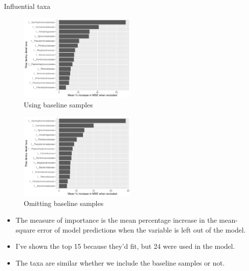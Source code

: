 \documentclass{beamer}
\begin{document}
\begin{frame}{Influential taxa}

  \begin{minipage}{0.47\textwidth}
    \begin{figure}
    \includegraphics[width=2.25in]{HenleyLake/bacteria/use_families/w_ribs/w_baseline/families_rib_PercIncMSE_barchart}
    \caption{{\tiny Using baseline samples}}
\end{figure}
\end{minipage}
\begin{minipage}{0.47\textwidth}
  \begin{figure}
    \includegraphics[width=2.25in]{HenleyLake/bacteria/use_families/w_ribs/no_baseline/families_rib_no_baseline_PercIncMSE_barchart}
    \caption{{\tiny Omitting baseline samples}}
  \end{figure}
  \end{minipage}
  \vspace{0.1in}
  {\scriptsize
  \begin{itemize}
  \item The measure of importance is the mean percentage increase in the
    mean-square error of model predictions when the variable is left out of the
    model. 
  \item I've shown the top 15 because they'd fit, but 24 were used in the model.
  \item The taxa are similar whether we include the baseline samples or not.
  \end{itemize}
  }

\end{frame}
\end{document}
